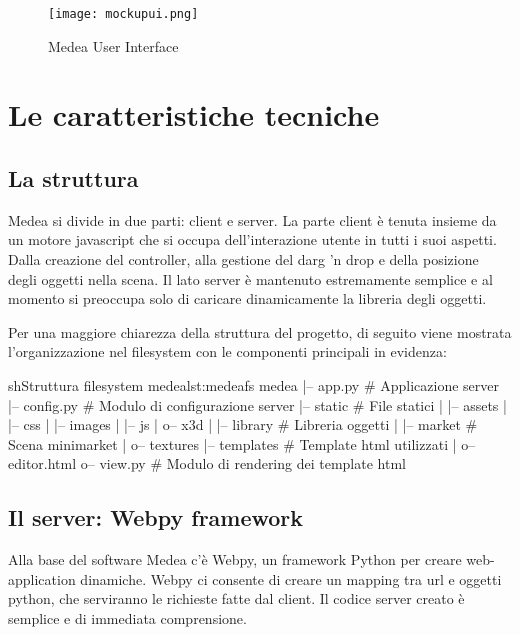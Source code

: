 \begin{figure}[Ht]
\centering
\texttt{[image: mockupui.png]}
\caption{Medea User Interface}
\label{label:mockupui}
\end{figure}

\section{Le caratteristiche tecniche}

\subsection{La struttura}
Medea si divide in due parti: client e server. La parte client è tenuta insieme da un motore javascript che si occupa dell'interazione utente in tutti i suoi aspetti. Dalla creazione del controller, alla gestione del darg 'n drop e della posizione degli oggetti nella scena. Il lato server è mantenuto estremamente semplice e al momento si preoccupa solo di caricare dinamicamente la libreria degli oggetti.

Per una maggiore chiarezza della struttura del progetto, di seguito viene mostrata l'organizzazione nel filesystem con le componenti principali in evidenza:

\begin{mylisting}{sh}{Struttura filesystem medea}{lst:medeafs}
medea
|-- app.py              # Applicazione server
|-- config.py           # Modulo di configurazione server
|-- static              # File statici
|   |-- assets
|   |-- css
|   |-- images
|   |-- js
|   o-- x3d
|       |-- library     # Libreria oggetti
|       |-- market      # Scena minimarket
|       o-- textures
|-- templates           # Template html utilizzati
|   o-- editor.html     
o-- view.py             # Modulo di rendering dei template html
\end{mylisting}


\subsection{Il server: Webpy framework}
Alla base del software Medea c'è Webpy, un framework Python per creare web-application dinamiche. Webpy ci consente di creare un mapping tra url e oggetti python, che serviranno le richieste fatte dal client. Il codice server creato è semplice e di immediata comprensione. 

